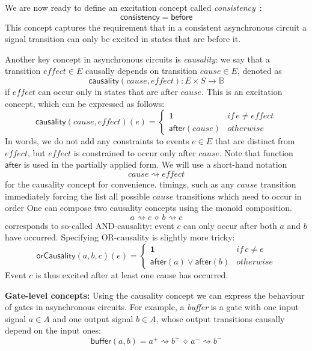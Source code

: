 \documentclass[british, journal]{IEEEtran}
\begin{document}
We are now ready to define an excitation concept called
\emph{consistency}~\cite{Cortadella}:
\[
\mathsf{consistency}=\mathsf{before}
\]
This concept captures the requirement that in a consistent asynchronous
circuit a signal transition can only be excited in states that are
before it.

Another key concept in asynchronous circuits is \emph{causality}:
we say that a transition $\mathit{effect}\in E$ causally depends
on transition $\mathit{cause}\in E$, denoted as
\[
\mathsf{causality}(\mathit{cause},\mathit{effect}):E\times
S\rightarrow\mathbb{B}
\]
 if $\mathit{effect}$ can occur only in states that are after $\mathit{cause}$.
This is an excitation concept, which can be expressed as follows:
\[
\mathsf{causality}(\mathit{cause},\mathit{effect})(e)\!=\!\begin{cases}
\mathbf{1} & \mathit{if}\, e\neq\mathit{effect}\\
\mathsf{after}(cause) & \mathit{otherwise}
\end{cases}
\]
In words, we do not add any constraints to events $e\in E$ that are
distinct from $\mathit{effect}$, but $\mathit{effect}$ is constrained
to occur only after $\mathit{cause}$. Note that function $\mathsf{after}$
is used in the partially applied form. We will use a short-hand notation
\[
\mathit{cause}\rightsquigarrow\mathit{effect}
\]
for the causality concept for convenience.
timings, such as any $\mathit{cause}$ transition immediately forcing the
list all possible $\mathit{cause}$ transitions which need to occur in order
One can compose two causality concepts using the monoid composition.
\[
a\rightsquigarrow c\ \diamond\ b\rightsquigarrow c
\]
corresponds to so-called AND-causality: event $c$ can only occur
after both $a$ and $b$ have occurred. Specifying OR-causality is
slightly more tricky:
\[
\mathsf{orCausality}(a,b,c)(e)=\begin{cases}
\mathbf{1} & \mathit{if}\, c\neq\mathit{e}\\
\mathsf{after}(a)\vee\mathsf{after}(b) & \mathit{otherwise}
\end{cases}
\]
Event $c$ is thus excited after at least one cause has occurred.

\textbf{Gate-level concepts:} Using the causality concept we can express
the behaviour of gates in asynchronous circuits. For example, a \emph{buffer}
is a gate with one input signal $a\in A$ and one output signal $b\in A$,
whose output transitions causally depend on the input ones:
\[
\mathsf{buffer}(a, b)=a^{+}\rightsquigarrow b^{+}\ \diamond\
a^{-}\rightsquigarrow b^{-}
\]
\end{document}
